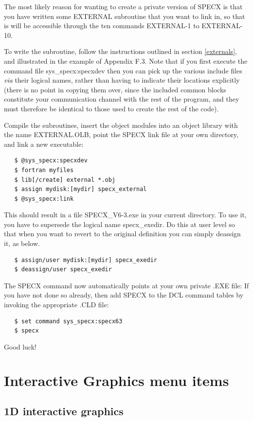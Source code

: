 \documentclass[11pt,twoside]{report}
\begin{document}
The most likely reason for wanting to create a private version of SPECX is
that you have written some EXTERNAL subroutine that you want to link in, so
that is will be accessible through the ten commands EXTERNAL-1 to EXTERNAL-10.

To write the subroutine, follow the instructions outlined in section
\ref{externals}, and illustrated in the example of Appendix F.3. Note that if
you first execute the command file sys\_specx:specxdev then you can pick up the
various include files {\em via} their logical names, rather than having to
indicate their locations explicitly (there is no point in copying them over,
since the included common blocks constitute your communication channel with the
rest of the program, and they must therefore be identical to those used to
create the rest of the code).

Compile the subroutines, insert the object modules into an object library
with the name EXTERNAL.OLB, point the SPECX link file at your own directory,
and link a new executable:
\begin{verbatim}
   $ @sys_specx:specxdev
   $ fortran myfiles
   $ lib[/create] external *.obj
   $ assign mydisk:[mydir] specx_external
   $ @sys_specx:link
\end{verbatim}

This should result in a file SPECX\_V6-3.exe in your current directory. To
use it, you have to supersede the logical name specx\_exedir. Do this
at user level so that when you want to revert to the original
definition you can simply deassign it, as below.
\begin{verbatim}
   $ assign/user mydisk:[mydir] specx_exedir
   $ deassign/user specx_exedir
\end{verbatim}

The SPECX command now automatically points at your own private .EXE file: If you
have not done so already, then add SPECX to the DCL command tables
by invoking the appropriate .CLD file:
\begin{verbatim}
   $ set command sys_specx:specx63
   $ specx
\end{verbatim}

Good luck!

\newpage
\chapter{Interactive Graphics menu items} 
\section{1D interactive graphics}
\end{document}
